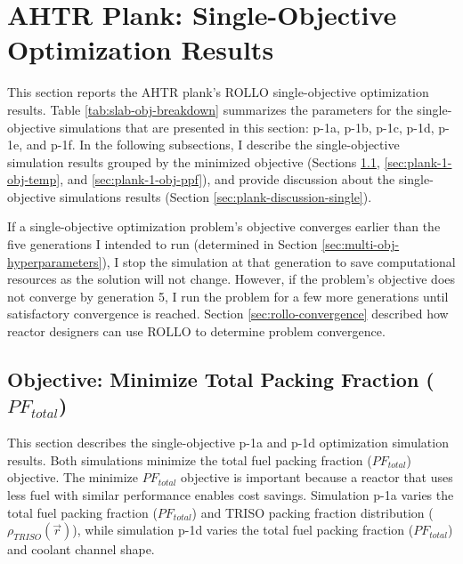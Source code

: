 \section{AHTR Plank: Single-Objective Optimization Results}
\label{sec:plank-one-obj}
This section reports the \gls{AHTR} plank's \gls{ROLLO} single-objective 
optimization results. 
Table \ref{tab:slab-obj-breakdown} summarizes the parameters for the single-objective 
simulations that are presented in this section: p-1a, p-1b, p-1c, p-1d, p-1e, and p-1f. 
In the following subsections, I describe the single-objective simulation results 
grouped by the minimized objective (Sections \ref{sec:plank-1-obj-pf}, 
\ref{sec:plank-1-obj-temp}, and \ref{sec:plank-1-obj-ppf}), and provide discussion 
about the single-objective simulations results (Section 
\ref{sec:plank-discussion-single}).

If a single-objective optimization problem's objective converges earlier than the 
five generations I intended to run (determined in Section 
\ref{sec:multi-obj-hyperparameters}), I stop the simulation at that generation to 
save computational resources as the solution will not change.
However, if the problem's objective does not converge by generation 5, I run the 
problem for a few more generations until satisfactory convergence is reached.
Section \ref{sec:rollo-convergence} described how reactor designers can use 
\gls{ROLLO} to determine problem convergence. 

\subsection{Objective: Minimize Total Packing Fraction ($PF_{total}$)}
\label{sec:plank-1-obj-pf}
This section describes the single-objective p-1a and p-1d optimization simulation
results. 
Both simulations minimize the total fuel packing fraction ($PF_{total}$) objective. 
The minimize $PF_{total}$ objective is important because a reactor that uses less fuel
with similar performance enables cost savings. 
Simulation p-1a varies the total fuel packing fraction ($PF_{total}$) and \gls{TRISO} 
packing fraction distribution ($\rho_{TRISO}(\vec{r})$), while simulation p-1d varies 
the total fuel packing fraction ($PF_{total}$) and coolant channel shape. 

